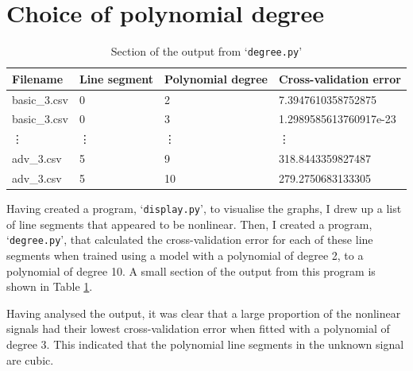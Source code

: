 \documentclass[onecolumn, 12pt, a4paper]{article}
\begin{document}
\section{Choice of polynomial degree}

\begin{table}[htbp]
    \begin{center}
        \caption{\label{tab:degree.py}Section of the output from `\texttt{degree.py}'}
    \begin{tabular}{l l l l} 
        \hline\hline
        Filename & Line segment & Polynomial degree & Cross-validation error \\ [0.5ex] 
        \hline
        basic\_3.csv & 0 & 2 & 7.3947610358752875 \\ 
        basic\_3.csv & 0 & 3 & 1.2989585613760917e-23 \\
        \vdots & \vdots & \vdots & \vdots \\
        adv\_3.csv & 5 & 9 & 318.8443359827487 \\
        adv\_3.csv & 5 & 10 & 279.2750683133305 \\
        \hline
    \end{tabular}
    \end{center}
\end{table}

Having created a program, `\texttt{display.py}', to visualise
the graphs, I drew up a list of line segments that appeared to
be nonlinear.
Then, I created a program, `\texttt{degree.py}', that calculated
the cross-validation error for each of these line segments
when trained using a model with a polynomial of degree 2,
to a polynomial of degree 10. A small section of the output
from this program is shown in Table \ref{tab:degree.py}.

Having analysed the output, it was clear that a large
proportion of the nonlinear signals had their lowest
cross-validation error when fitted with a polynomial of degree
3.
This indicated that the polynomial line segments in 
the unknown signal are cubic.
\end{document}
